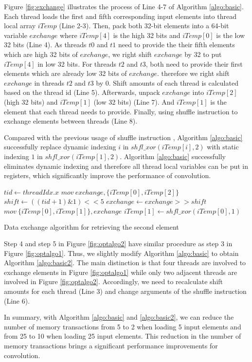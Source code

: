 \documentclass[sigplan,review,anonymous]{acmart}\settopmatter{printfolios=true,printccs=false,printacmref=false}
\begin{document}
Figure \ref{fig:exchange} illustrates the process of Line 4-7 of Algorithm \ref{algo:basic}. Each thread loads the first and fifth corresponding input elements into thread local array $iTemp$ (Line 2-3). Then, pack both 32-bit elements into a 64-bit variable $exchange$ where $iTemp[4]$ is the high 32 bits and $iTemp[0]$ is the low 32 bits (Line 4). As threads $t0$ and $t1$ need to provide the their fifth elements which are high 32 bits of $exchange$, we right shift $exchange$ by 32 to put $iTemp[4]$ in low 32 bits. For threads $t2$ and $t3$, both need to provide their first elements which are already low 32 bits of $exchange$. therefore we right shift $exchange$ in threads $t2$ and $t3$ by 0. Shift amounts of each thread is calculated based on the thread id (Line 5). Afterwards, unpack $exchange$ into $iTemp[2]$ (high 32 bits) and $iTemp[1]$ (low 32 bits) (Line 7). And $iTemp[1]$ is the element that each thread needs to provide. Finally, using shuffle instruction to exchange elements between threads (Line 8).

Compared with the previous usage of shuffle instruction \cite{vasilache2014fast}, Algorithm \ref{algo:basic} successfully replace dynamic indexing $i$ in $shfl\_xor(iTemp[i],2)$ with static indexing $1$ in $shfl\_xor(iTemp[1],2)$.
Algorithm \ref{algo:basic} successfully eliminates dynamic indexing and therefore all thread local variables can be put in registers, which significantly improve the performance of convolution.

\begin{algorithm}
	$tid \gets threadIdx.x$\;
	$mov\ exchange, \{iTemp[0], iTemp[2]\}$\;
	$shift \gets ((tid+1)\&1)<<5$\;
	$exchange \gets exchange >> shift$\;
	$mov\ \{iTemp[0],iTemp[1]\}, exchange$\;
	$iTemp[1] \gets shfl\_xor(iTemp[0],1)$\;	
	\caption{Data exchange algorithm for retrieving the second element}
	\label{algo:basic2}
\end{algorithm}

Step 4 and step 5 in Figure \ref{fig:optalgo2} have similar procedure as step 3 in Figure \ref{fig:optalgo1}. Thus, we slightly modify Algorithm \ref{algo:basic} to obtain Algorithm \ref{algo:basic2}. The main distinction is that four threads are involved to exchange elements in Figure \ref{fig:optalgo1} while only two adjacent threads are involved in Figure \ref{fig:optalgo2}. Accordingly, we need to recalculate shift amounts for each thread (Line 3) and change arguments of the shuffle instruction (Line 6).

In summary, with Algorithm \ref{algo:basic} and \ref{algo:basic2}, we can reduce the number of memory transactions from 5 to 2 when loading 5 input elements and from 25 to 10 when loading 25 input elements. This reduction in the number of memory transactions brings a significant performance improvements for convolution.
\end{document}
